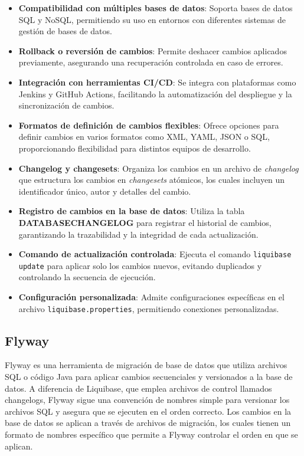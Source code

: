 \documentclass{IEEEtran}
\begin{document}
\begin{itemize}
    \item \textbf{Compatibilidad con múltiples bases de datos}: Soporta bases de datos SQL y NoSQL, permitiendo su uso en entornos con diferentes sistemas de gestión de bases de datos.
    \item \textbf{Rollback o reversión de cambios}: Permite deshacer cambios aplicados previamente, asegurando una recuperación controlada en caso de errores.
    \item \textbf{Integración con herramientas CI/CD}: Se integra con plataformas como Jenkins y GitHub Actions, facilitando la automatización del despliegue y la sincronización de cambios.
    \item \textbf{Formatos de definición de cambios flexibles}: Ofrece opciones para definir cambios en varios formatos como XML, YAML, JSON o SQL, proporcionando flexibilidad para distintos equipos de desarrollo.
    \item \textbf{Changelog y changesets}: Organiza los cambios en un archivo de \textit{changelog} que estructura los cambios en \textit{changesets} atómicos, los cuales incluyen un identificador único, autor y detalles del cambio.
    \item \textbf{Registro de cambios en la base de datos}: Utiliza la tabla \textbf{DATABASECHANGELOG} para registrar el historial de cambios, garantizando la trazabilidad y la integridad de cada actualización.
    \item \textbf{Comando de actualización controlada}: Ejecuta el comando \texttt{liquibase update} para aplicar solo los cambios nuevos, evitando duplicados y controlando la secuencia de ejecución.
    \item \textbf{Configuración personalizada}: Admite configuraciones específicas en el archivo \texttt{liquibase.properties}, permitiendo conexiones personalizadas.
\end{itemize}

\subsection{Flyway}
Flyway es una herramienta de migración de base de datos que utiliza archivos SQL o código Java para aplicar cambios secuenciales y versionados a la base de datos. A diferencia de Liquibase, que emplea archivos de control llamados changelogs, Flyway sigue una convención de nombres simple para versionar los archivos SQL y asegura que se ejecuten en el orden correcto. Los cambios en la base de datos se aplican a través de archivos de migración, los cuales tienen un formato de nombres específico que permite a Flyway controlar el orden en que se aplican. 
\end{document}
